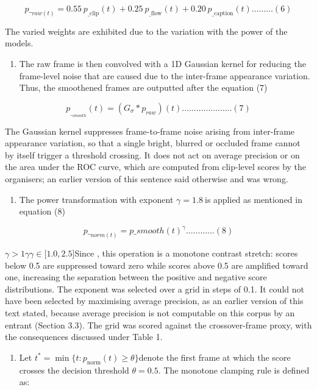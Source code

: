 \[{p\_}_{raw(t)} = 0.55\text{ }p_{\text{\_}\text{clip}}(t) + 0.25\text{ }p_{\text{\_}\text{flow}}(t) + 0.20\text{ }p_{\text{\_}\text{caption}}(t)\ldots\ldots\ldots(6)\]

The varied weights are exhibited due to the variation with the power of the models.

\begin{enumerate}
\def\labelenumi{\arabic{enumi}.}
\setcounter{enumi}{1}
\item
  The raw frame is then convolved with a 1D Gaussian kernel for reducing the frame-level noise that are caused due to the inter-frame appearance variation. Thus, the smoothened frames are outputted after the equation (7)
\end{enumerate}

\[p_{\__{smooth}}(t) = \left( G_{\sigma}*p_{raw} \right)(t)\ldots\ldots\ldots\ldots\ldots\ldots\ldots(7)\]

The Gaussian kernel suppresses frame-to-frame noise arising from inter-frame appearance variation, so that a single bright, blurred or occluded frame cannot by itself trigger a threshold crossing. It does not act on average precision or on the area under the ROC curve, which are computed from clip-level scores by the organisers; an earlier version of this sentence said otherwise and was wrong.

\begin{enumerate}
\def\labelenumi{\arabic{enumi}.}
\setcounter{enumi}{2}
\item
  The power transformation with exponent \(\gamma = 1.8\ \)is applied as mentioned in equation (8)
\end{enumerate}

\[{p\_}_{norm(t)} = {p\_ smooth(t)}^{\gamma}\ldots\ldots\ldots\ldots(8)\]

\(\gamma > 1\gamma\gamma \in \lbrack 1.0,2.5\rbrack\)Since , this operation is a monotone contrast stretch: scores below 0.5 are suppressed toward zero while scores above 0.5 are amplified toward one, increasing the separation between the positive and negative score distributions. The exponent was selected over a grid in steps of 0.1. It could not have been selected by maximising average precision, as an earlier version of this text stated, because average precision is not computable on this corpus by an entrant (Section 3.3). The grid was scored against the crossover-frame proxy, with the consequences discussed under Table 1.

\begin{enumerate}
\def\labelenumi{\arabic{enumi}.}
\setcounter{enumi}{3}
\item
  Let \(t^{*} = \min\{ t:p_{\text{norm}}(t) \geq \theta\}\)denote the first frame at which the score crosses the decision threshold \(\theta = 0.5\). The monotone clamping rule is defined as:
\end{enumerate}


